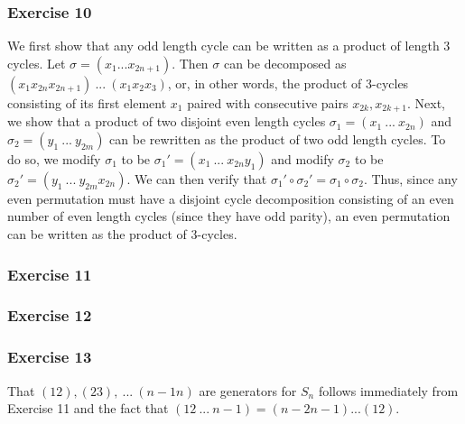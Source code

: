 \subsubsection{Exercise 10}
We first show that any odd length cycle can be written as a product of length 3 cycles. Let $\sigma = 
(x_1 ... x_{2n + 1})$. Then $\sigma$ can be decomposed as $(x_1 x_{2n} x_{2n+1}) \: ... \: (x_1 x_2 x_3)$, or,
in other words, the product of 3-cycles consisting of its first element $x_1$ paired with consecutive pairs
$x_{2k}, x_{2k+1}$. Next, we show that a product of two disjoint even length cycles $\sigma_1 = (x_1 \: ... \: x_{2n})$ 
and $\sigma_2 = (y_1 \: ... \: y_{2m})$ can be rewritten as the product of two odd length cycles. To do so,
we modify $\sigma_1$ to be $\sigma_1' = (x_1 \: ... \: x_{2n} y_1)$ and modify $\sigma_2$ to be 
$\sigma_2' = (y_1 \: ... \: y_{2m} x_{2n})$. We can then verify that $\sigma_1' \circ \sigma_2' = \sigma_1 \circ \sigma_2$. Thus, since any even permutation must have a disjoint cycle decomposition consisting of an even 
number of even length cycles (since they have odd parity), an even permutation can be written as the product
of 3-cycles.

\subsubsection{Exercise 11}

\subsubsection{Exercise 12}

\subsubsection{Exercise 13}
That $(1 2), (2 3), \: ...\:  (n - 1 n)$ are generators for $S_n$ follows immediately from Exercise 11 and the fact 
that $(1 2 \: ... \: n - 1) = (n - 2 n - 1) ... (1 2)$.
